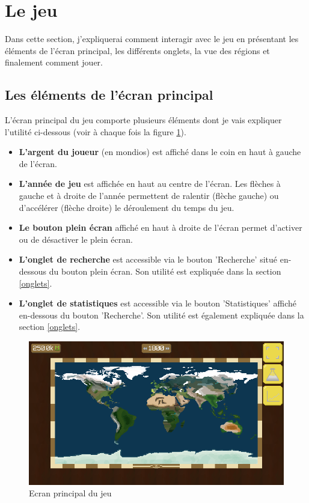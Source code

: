 \documentclass{article}
\begin{document}
        \section{Le jeu}
		Dans cette section, j'expliquerai comment interagir avec le jeu en présentant les éléments de l'écran principal, les différents onglets, la vue des régions et finalement comment jouer.        
        
        \subsection{Les éléments de l'écran principal}
		L'écran principal du jeu comporte plusieurs éléments dont je vais expliquer l'utilité ci-dessous (voir à chaque fois la figure \ref{fig:worldView}).
		
		\begin{itemize}
			\item \textbf{L'argent du joueur} (en mondios) est affiché dans le coin en haut à gauche de l'écran.
			\item \textbf{L'année de jeu} est affichée en haut au centre de l'écran. Les flèches à gauche et à droite de l'année permettent de ralentir (flèche gauche) ou d’accélérer (flèche droite) le déroulement du temps du jeu.
			\item \textbf{Le bouton plein écran} affiché en haut à droite de l'écran permet d'activer ou de désactiver le plein écran.
			\item \textbf{L'onglet de recherche} est accessible via le bouton 'Recherche' situé en-dessous du bouton plein écran. Son utilité est expliquée dans la section \ref{onglets}.
			\item  \textbf{L'onglet de statistiques} est accessible via le bouton 'Statistiques' affiché en-dessous du bouton 'Recherche'. Son utilité est également expliquée dans la section \ref{onglets}.
		\end{itemize}
		
		\begin{figure}[H]
                \includegraphics[width=\linewidth]{../images/worldView}
                \caption{Ecran principal du jeu}
                \label{fig:worldView}
        \end{figure} 
		
\end{document}
